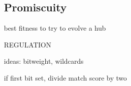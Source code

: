 %
%
%


\subsection{Promiscuity}

best fitness to try to evolve a hub

REGULATION

ideas: bitweight, wildcards

if first bit set, divide match score by two
